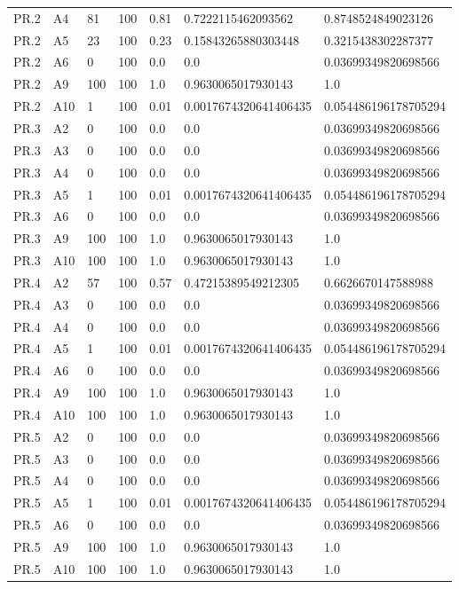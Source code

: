 \begin{tabular}{lllllll}
PR.2 & A4 & 81 & 100 & 0.81 & 0.7222115462093562 & 0.8748524849023126 \\
PR.2 & A5 & 23 & 100 & 0.23 & 0.15843265880303448 & 0.3215438302287377 \\
PR.2 & A6 & 0 & 100 & 0.0 & 0.0 & 0.03699349820698566 \\
PR.2 & A9 & 100 & 100 & 1.0 & 0.9630065017930143 & 1.0 \\
PR.2 & A10 & 1 & 100 & 0.01 & 0.0017674320641406435 & 0.054486196178705294 \\
PR.3 & A2 & 0 & 100 & 0.0 & 0.0 & 0.03699349820698566 \\
PR.3 & A3 & 0 & 100 & 0.0 & 0.0 & 0.03699349820698566 \\
PR.3 & A4 & 0 & 100 & 0.0 & 0.0 & 0.03699349820698566 \\
PR.3 & A5 & 1 & 100 & 0.01 & 0.0017674320641406435 & 0.054486196178705294 \\
PR.3 & A6 & 0 & 100 & 0.0 & 0.0 & 0.03699349820698566 \\
PR.3 & A9 & 100 & 100 & 1.0 & 0.9630065017930143 & 1.0 \\
PR.3 & A10 & 100 & 100 & 1.0 & 0.9630065017930143 & 1.0 \\
PR.4 & A2 & 57 & 100 & 0.57 & 0.47215389549212305 & 0.6626670147588988 \\
PR.4 & A3 & 0 & 100 & 0.0 & 0.0 & 0.03699349820698566 \\
PR.4 & A4 & 0 & 100 & 0.0 & 0.0 & 0.03699349820698566 \\
PR.4 & A5 & 1 & 100 & 0.01 & 0.0017674320641406435 & 0.054486196178705294 \\
PR.4 & A6 & 0 & 100 & 0.0 & 0.0 & 0.03699349820698566 \\
PR.4 & A9 & 100 & 100 & 1.0 & 0.9630065017930143 & 1.0 \\
PR.4 & A10 & 100 & 100 & 1.0 & 0.9630065017930143 & 1.0 \\
PR.5 & A2 & 0 & 100 & 0.0 & 0.0 & 0.03699349820698566 \\
PR.5 & A3 & 0 & 100 & 0.0 & 0.0 & 0.03699349820698566 \\
PR.5 & A4 & 0 & 100 & 0.0 & 0.0 & 0.03699349820698566 \\
PR.5 & A5 & 1 & 100 & 0.01 & 0.0017674320641406435 & 0.054486196178705294 \\
PR.5 & A6 & 0 & 100 & 0.0 & 0.0 & 0.03699349820698566 \\
PR.5 & A9 & 100 & 100 & 1.0 & 0.9630065017930143 & 1.0 \\
PR.5 & A10 & 100 & 100 & 1.0 & 0.9630065017930143 & 1.0 \\

\end{tabular}
